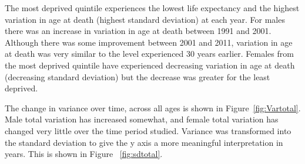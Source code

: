 \documentclass[12pt,oneside,a4paper]{article} %
\theoremstyle{definition}
\begin{document}
The most deprived quintile experiences the lowest life expectancy and
the highest variation in age at death (highest standard deviation) at each year. For males there was an
increase in variation in age at death between 1991 and 2001. Although there was
some improvement between 2001 and 2011, variation in age at death was very
similar to the level experienced 30 years earlier. Females from the most
deprived quintile have experienced decreasing variation in age at death (decreasing standard deviation) but the
decrease was greater for the least deprived. 

The change in variance over time, across all ages is shown in Figure~\ref{fig:Vartotal}. Male total variation has increased somewhat, and female total variation has changed
very little over the time period studied. Variance was transformed into the standard deviation to give the y axis a more meaningful interpretation in  years. This is shown in Figure ~\ref{fig:sdtotal}. 
\end{document}
